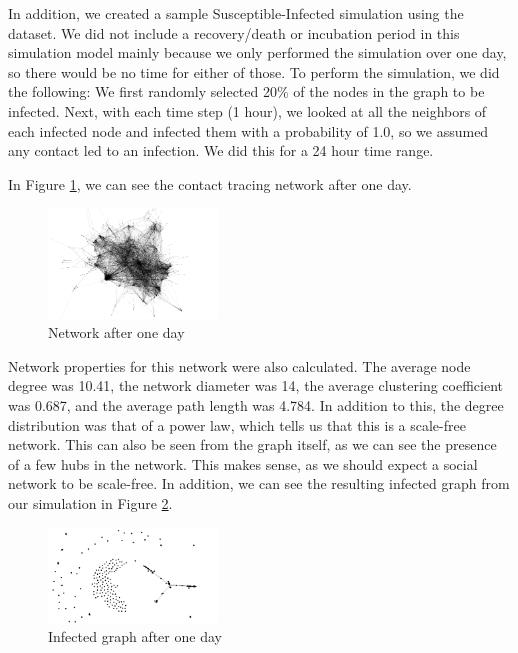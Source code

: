 \documentclass[times, 10pt,twocolumn]{article}
\begin{document}
In addition, we created a sample Susceptible-Infected simulation using the dataset. We did not include a recovery/death or incubation period in this simulation model mainly because we only performed the simulation over one day, so there would be no time for either of those. To perform the simulation, we did the following: We first randomly selected 20\% of the nodes in the graph to be infected. Next, with each time step (1 hour), we looked at all the neighbors of each infected node and infected them with a probability of 1.0, so we assumed any contact led to an infection. We did this for a 24 hour time range.


In Figure \ref{fig:my_label}, we can see the contact tracing network after one day.
\begin{figure}
    \centering
    \includegraphics[width=0.4\textwidth]{imgs/one_day_net.png}
    \caption{Network after one day}
    \label{fig:my_label}
\end{figure}
Network properties for this network were also calculated. The average node degree was 10.41, the network diameter was 14, the average clustering coefficient was 0.687, and the average path length was 4.784. In addition to this, the degree distribution was that of a power law, which tells us that this is a scale-free network. This can also be seen from the graph itself, as we can see the presence of a few hubs in the network. This makes sense, as we should expect a social network to be scale-free.
In addition, we can see the resulting infected graph from our simulation in Figure \ref{fig:my_label2}.
\begin{figure}
    \centering
    \includegraphics[width=0.4\textwidth]{imgs/simulation.png}
    \caption{Infected graph after one day}
    \label{fig:my_label2}
\end{figure}
\end{document}
